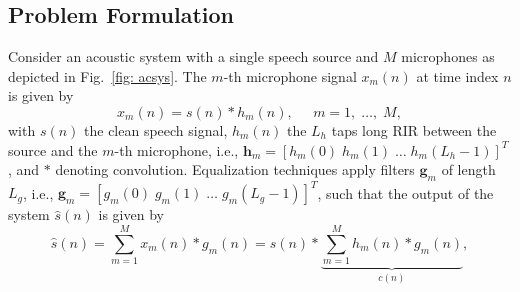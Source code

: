 \documentclass[11pt,draftcls,onecolumn]{IEEEtran}
\begin{document}
\subsection{Problem Formulation}
Consider an acoustic system with a single speech source and $M$ microphones as depicted in Fig.~\ref{fig: acsys}.
The $m$-th microphone signal $x_m(n)$ at time index $n$ is given by 
\begin{equation}
x_m(n) = s(n) \ast h_m(n), \; \; \; \; \; m = 1, \; \ldots, \; M,
\end{equation}
with $s(n)$ the clean speech signal, $h_m(n)$ the $L_h$ taps long RIR between the source and the $m$-th microphone, i.e., $\mathbf{h}_m = \left[h_m(0) \; h_m(1) \; \ldots \; h_m(L_h-1) \right]^T$, and $\ast$ denoting convolution.
Equalization techniques apply filters $\mathbf{g}_m$ of length $L_g$, i.e., $\mathbf{g}_m = \left[g_m(0) \; g_m(1) \; \ldots \; g_m(L_g-1) \right]^T$, such that the output of the system $\hat{s}(n)$ is given by
\begin{equation}
  \hat{s}(n) = \sum_{m=1}^{M} x_m(n) \ast g_m(n) = s(n) \ast \underbrace{\sum_{m=1}^{M} h_m(n) \ast g_m(n)}_{c(n)},
\end{equation}
\end{document}
